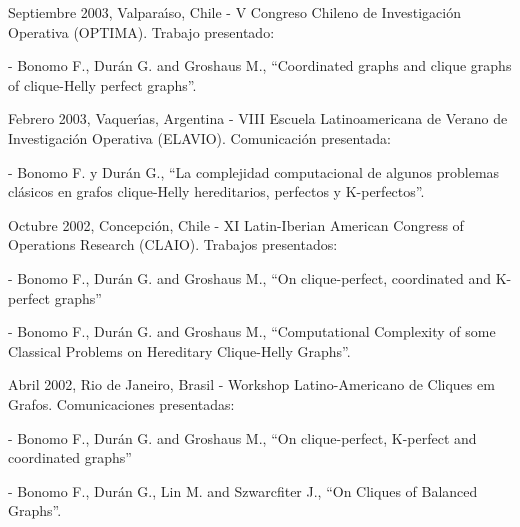 \smallskip

\item Septiembre 2003, Valpara\'{\i}so, Chile - V Congreso Chileno
de Investigaci\'on Ope\-ra\-ti\-va (OPTIMA). Trabajo presentado:
\begin{compactitem}
\item[-] Bonomo F., Dur\'an G. and Groshaus M., ``Coordinated
graphs and clique graphs of clique-Helly perfect graphs''.
\end{compactitem}

\smallskip

\item Febrero 2003, Vaquer\'{\i}as, Argentina - VIII Escuela
Latinoamericana de Verano de Investigaci\'on Operativa (ELAVIO).
Comunicaci\'on presentada:
\begin{compactitem}
\item[-] Bonomo F. y Dur\'an G., ``La complejidad computacional de
algunos proble\-mas cl\'asicos en grafos clique-Helly
hereditarios, perfectos y K-perfectos''.
\end{compactitem}

\smallskip

\item Octubre 2002, Concepci\'on, Chile - XI Latin-Iberian
American Congress of Operations Research (CLAIO). Trabajos
presentados:
\begin{compactitem}
\item[-] Bonomo F., Dur\'an G. and Groshaus M., ``On
clique-perfect, coordinated and K-perfect graphs'' \item[-] Bonomo
F., Dur\'an G. and Groshaus M., ``Computational Complexity of some
Classical Problems on Hereditary Clique-Helly Graphs''.
\end{compactitem}

\smallskip

\item Abril 2002, Rio de Janeiro, Brasil - Workshop
Latino-Americano de Cliques em Grafos. Comunicaciones presentadas:
\begin{compactitem}
\item[-] Bonomo F., Dur\'an G. and Groshaus M., ``On
clique-perfect, K-perfect and coordinated graphs'' \item[-] Bonomo
F., Dur\'an G., Lin M. and Szwarcfiter J., ``On Cliques of
Balanced Graphs''.
\end{compactitem}
